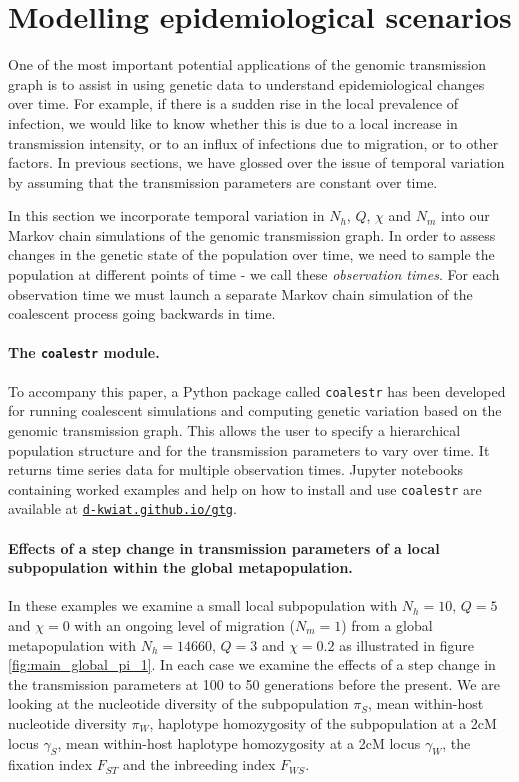 \documentclass[_main.tex]{subfiles}
\begin{document}
\section*{Modelling epidemiological scenarios}

One of the most important potential applications of the genomic transmission graph is to assist in using genetic data to understand epidemiological changes over time.  For example, if there is a sudden rise in the local prevalence of infection, we would like to know whether this is due to a local increase in transmission intensity, or to an influx of infections due to migration, or to other factors.  In previous sections, we have glossed over the issue of temporal variation by assuming that the transmission parameters are constant over time.

In this section we incorporate temporal variation in $N_h$, $Q$, $\chi$ and $N_m$ into our Markov chain simulations of the genomic transmission graph.   In order to assess changes in the genetic state of the population over time, we need to sample the population at different points of time - we call these \textit{observation times}.  For each observation time we must launch a separate Markov chain simulation of the coalescent process going backwards in time.  

\paragraph{The \texttt{coalestr} module.}  To accompany this paper, a Python package called \texttt{coalestr} has been developed for running coalescent simulations and computing genetic variation based on the genomic transmission graph.  This allows the user to specify a hierarchical population structure and for the transmission parameters to vary over time.  It returns time series data for multiple observation times.  Jupyter notebooks containing worked examples and help on how to install and use \texttt{coalestr} are available at \href{https://d-kwiat.github.io/gtg}{\texttt{d-kwiat.github.io/gtg}}. 

\paragraph{Effects of a step change in transmission parameters of a local subpopulation within the global metapopulation.}  In these examples we examine a small local subpopulation with $N_h = 10$, $Q = 5$ and $\chi = 0$ with an ongoing level of migration ($N_m = 1$) from a global metapopulation with $N_h = 14660$, $Q = 3$ and $\chi = 0.2$ as illustrated in figure \ref{fig:main_global_pi_1}.  In each case we examine the effects of a step change in the transmission parameters at 100 to 50 generations before the present.   We are looking at the nucleotide diversity of the subpopulation $\pi_S$, mean within-host nucleotide diversity $\pi_W$, haplotype homozygosity of the subpopulation at a 2cM locus $\gamma_S$, mean within-host haplotype homozygosity at a 2cM locus $\gamma_W$, the fixation index $F_{ST}$ and the inbreeding index $F_{WS}$.
\end{document}
